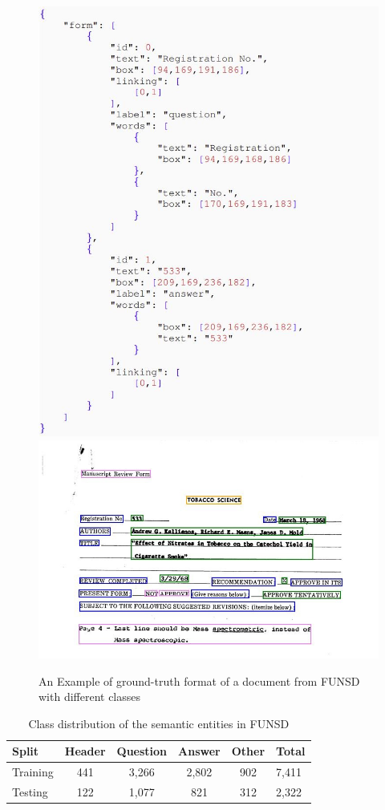 \begin{figure}[H]
    \centering
    \includegraphics[width=0.5 \textwidth]{chapters/images/Methods/Datasets/FUNSD.JPG}
    \includegraphics[width=0.8 \textwidth]{chapters/images/Methods/Datasets/different_classes.jpg}
    \caption{An Example of ground-truth format of a document from FUNSD \cite{jaume2019funsd} with different classes}
    \label{fig:FUNSD_ex}
\end{figure}

\begin{table}[H]
    \centering
    \begin{tabular}{lccccl}
    \hline
    \textbf{Split} & \textbf{Header} &\textbf{Question}& \textbf{Answer} & \textbf{Other} & \textbf{Total} \\ \toprule
    Training & 441 & 3,266 & 2,802 & 902 & 7,411 \\
    Testing & 122 & 1,077 & 821 & 312 & 2,322 \\ \bottomrule
    \end{tabular}
    \caption{Class distribution of the semantic entities in FUNSD}
    \label{tab:Class distribution FUNSD}
\end{table}

